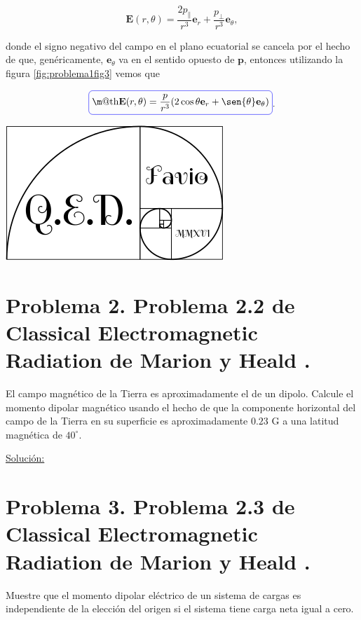 \documentclass[a4paper,11pt]{article}
\makeatletter
\numberwithin{equation}{section}
\newcommand*{\boxcolor}{blue}
\renewcommand{\boxed}[1]{\textcolor{\boxcolor}{%
\tikz[baseline={([yshift=-1ex]current bounding box.center)}] \node [rectangle, minimum width=1ex,rounded corners,draw] {\normalcolor\m@th$\displaystyle#1$};}}
\makeatother
\begin{document}
\begin{equation}
 \mathbf{E}(r,\theta) = \frac{2p_\parallel}{r^3} \mathbf{e}_r + 
 \frac{p_\bot}{r^3}\mathbf{e}_\theta,
\end{equation}

donde el signo negativo del campo en el plano ecuatorial se cancela por el hecho de 
que, genéricamente, $\mathbf{e}_\theta$ va en el sentido opuesto de $\mathbf{p}$, 
entonces utilizando la figura \eqref{fig:problema1fig3} vemos que 

\begin{equation}
 \boxed{\mathbf{E}(r,\theta) = \frac{p}{r^3}(2\cos{\theta}\mathbf{e}_r + 
 \sen{\theta}\mathbf{e}_\theta)}.
\end{equation}

\hspace{10cm}\includegraphics[scale=0.25]{logoQED}

\section{Problema 2. Problema 2.2 de Classical Electromagnetic Radiation
de Marion y Heald \cite{marion2}.}

El campo magnético de la Tierra es aproximadamente el de un dipolo. Calcule el momento 
dipolar magnético usando el hecho de que la componente horizontal del campo de la 
Tierra en su superficie es aproximadamente $0.23$ G a una latitud magnética de 
$40^\circ$.

\vspace{.3cm}

\underline{Solución:} \vspace{.3cm}

\section{Problema 3. Problema 2.3 de Classical Electromagnetic Radiation
de Marion y Heald \cite{marion2}.}

Muestre que el momento dipolar eléctrico de un sistema de cargas es independiente 
de la elección del origen si el sistema tiene carga neta igual a cero.
\end{document}
